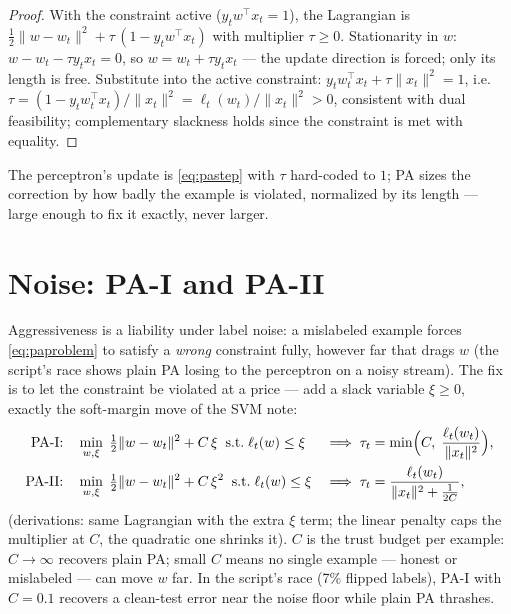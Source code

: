 \documentclass[11pt]{article}
\begin{document}
\begin{proof}
With the constraint active ($y_t w^\top x_t = 1$), the Lagrangian is
$\tfrac12\lVert w-w_t\rVert^2 + \tau\,(1 - y_t w^\top x_t)$ with
multiplier $\tau \ge 0$. Stationarity in $w$:
$w - w_t - \tau y_t x_t = 0$, so $w = w_t + \tau y_t x_t$ --- the update
direction is forced; only its length is free. Substitute into the active
constraint:
$y_t w_t^\top x_t + \tau \lVert x_t\rVert^2 = 1$, i.e.\
$\tau = (1 - y_t w_t^\top x_t)/\lVert x_t\rVert^2 =
\ell_t(w_t)/\lVert x_t\rVert^2 > 0$, consistent with dual feasibility;
complementary slackness holds since the constraint is met with equality.
\end{proof}

The perceptron's update is \eqref{eq:pastep} with $\tau$ hard-coded to
$1$; PA sizes the correction by how badly the example is violated,
normalized by its length --- large enough to fix it exactly, never
larger.

\section{Noise: PA-I and PA-II}

Aggressiveness is a liability under label noise: a mislabeled example
forces \eqref{eq:paproblem} to satisfy a \emph{wrong} constraint fully,
however far that drags $w$ (the script's race shows plain PA losing to
the perceptron on a noisy stream). The fix is to let the constraint be
violated at a price --- add a slack variable $\xi \ge 0$, exactly the
soft-margin move of the SVM note:
\begin{align}
  \text{PA-I:}\quad
  &\min_{w,\xi}\; \tfrac12\lVert w-w_t\rVert^2 + C\,\xi
  \;\;\text{s.t.}\; \ell_t(w) \le \xi
  &&\Longrightarrow\;
  \tau_t = \min\Bigl(C,\; \frac{\ell_t(w_t)}{\lVert x_t\rVert^2}\Bigr),
  \label{eq:pai}\\
  \text{PA-II:}\quad
  &\min_{w,\xi}\; \tfrac12\lVert w-w_t\rVert^2 + C\,\xi^2
  \;\;\text{s.t.}\; \ell_t(w) \le \xi
  &&\Longrightarrow\;
  \tau_t = \frac{\ell_t(w_t)}{\lVert x_t\rVert^2 + \tfrac{1}{2C}} ,
  \label{eq:paii}
\end{align}
(derivations: same Lagrangian with the extra $\xi$ term; the linear
penalty caps the multiplier at $C$, the quadratic one shrinks it).
$C$ is the trust budget per example: $C \to \infty$ recovers plain PA;
small $C$ means no single example --- honest or mislabeled --- can move
$w$ far. In the script's race (7\% flipped labels), PA-I with $C = 0.1$
recovers a clean-test error near the noise floor while plain PA thrashes.
\end{document}
